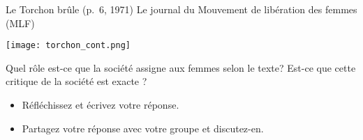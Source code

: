 \begin{frame}{Le Torchon brûle (p.~6, 1971)}
  Le journal du Mouvement de libération des femmes (MLF)

    \texttt{[image: torchon\_cont.png]}
    
  Quel rôle est-ce que la société assigne aux femmes selon le texte? Est-ce que cette critique de la société est exacte ?
  \begin{itemize}
    \item Réfléchissez et écrivez votre réponse.
    \item Partagez votre réponse avec votre groupe et discutez-en.
  \end{itemize}
\end{frame}